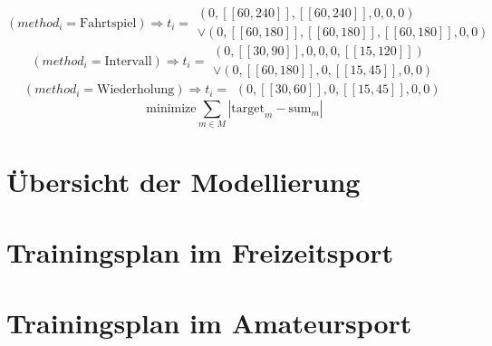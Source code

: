 \begin{equation*}
    (method_i = \text{Fahrtspiel})\Rightarrow t_i = \begin{array}{c}
            (0, [\![60, 240]\!], [\![60, 240]\!], 0, 0, 0) \\ 
        \vee (0, [\![60,180]\!], [\![60, 180]\!], [\![60, 180]\!], 0, 0)
    \end{array}
\end{equation*}
\begin{equation*}
    (method_i = \text{Intervall})\Rightarrow t_i = \begin{array}{c}
            (0, [\![30, 90]\!], 0, 0, 0, [\![15, 120]\!]) \\ 
        \vee (0, [\![60,180]\!], 0, [\![15, 45]\!], 0, 0)
    \end{array}
\end{equation*}
\begin{equation*}
    (method_i = \text{Wiederholung})\Rightarrow t_i = \begin{array}{c}
            (0, [\![30, 60]\!], 0, [\![15, 45]\!], 0, 0)
    \end{array}
\end{equation*}
\begin{equation*}
    \text{minimize} \sum_{m\in M} |\text{target}_m - \text{sum}_m|
\end{equation*} 

\newpage
\section{Übersicht der Modellierung}
    \label{anhang:modellierung:gross}

\newpage
\section{Trainingsplan im Freizeitsport}
\label{anhang:freizeitsport}

\newpage
\section{Trainingsplan im Amateursport}
\label{anhang:amateursport}
